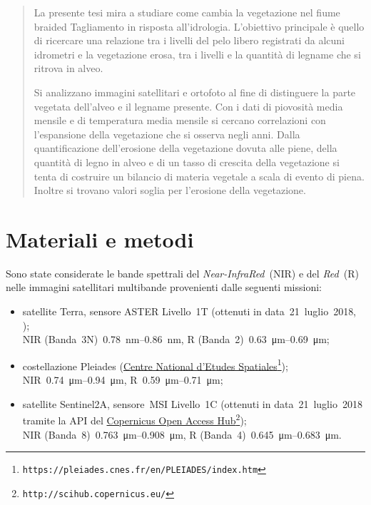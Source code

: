 \documentclass[12pt,a4paper]{article}
\begin{document}


\begin{abstract}
La presente tesi mira a studiare come cambia la vegetazione nel fiume braided Tagliamento in risposta all'idrologia. 
L'obiettivo principale è quello di ricercare una relazione tra i livelli del pelo libero registrati da alcuni idrometri e la vegetazione erosa, tra i livelli e la quantità di legname che si ritrova in alveo.

Si analizzano immagini satellitari e ortofoto al fine di distinguere la parte vegetata dell'alveo e il legname presente.
Con i dati di piovosità media mensile e di temperatura media mensile si cercano correlazioni con l'espansione della vegetazione che si osserva negli anni.
Dalla quantificazione dell'erosione della vegetazione dovuta alle piene, della quantità di legno in alveo e di un tasso di crescita della vegetazione si tenta di costruire un bilancio di materia vegetale a scala di evento di piena.
Inoltre si trovano valori soglia per l'erosione della vegetazione.
\end{abstract}

\clearpage

\tableofcontents
\listoffigures

\clearpage


\section{Materiali e metodi}
Sono state considerate le bande spettrali del \emph{Near-InfraRed}~(NIR) e del \emph{Red}~(R) nelle immagini satellitari multibande provenienti dalle seguenti missioni:
%
\begin{itemize}
	\item satellite Terra, sensore ASTER Livello~1T (ottenuti in data~21~luglio~2018, \cite{data:ASTER});  
		\\
		NIR (Banda~3N)~\SIrange[range-phrase={-}]{0.78}{0.86}{\nano\m}, R (Banda~2)~\SIrange[range-phrase={-}]{0.63}{0.69}{\micro\m};
	\item costellazione Pleiades (\href{https://pleiades.cnes.fr/en/PLEIADES/index.htm}{Centre National d'Etudes Spatiales}\footnote{\texttt{https://pleiades.cnes.fr/en/PLEIADES/index.htm}}); 
		\\
		NIR~\SIrange[range-phrase={-}]{0.74}{0.94}{\micro\m}, R~\SIrange[range-phrase={-}]{0.59}{0.71}{\micro\m};
	\item satellite Sentinel2A, sensore~MSI Livello~1C (ottenuti in data~21~luglio~2018 tramite la API del \href{http://scihub.copernicus.eu/}{Copernicus Open Access Hub}\footnote{\texttt{http://scihub.copernicus.eu/}});
		\\
		NIR (Banda~8)~\SIrange[range-phrase={-}]{0.763}{0.908}{\micro\m}, R (Banda~4)~\SIrange[range-phrase={-}]{0.645}{0.683}{\micro\m}.
\end{itemize}
%
\end{document}
